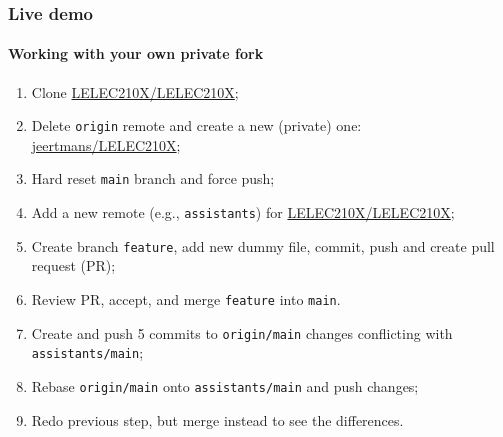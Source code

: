 \documentclass[t, aspectratio=169, english, table]{_style/tudelft-beamer}
\begin{document}
\begin{frame}
  \frametitle{Live demo}
  \framesubtitle{Working with your own private fork}

  \begin{enumerate}
    \item Clone \href{https://github.com/LELEC210X/LELEC210X}{\color{tud primary}LELEC210X/LELEC210X};
    \item Delete \texttt{origin} remote and create a new (private) one:  \href{https://github.com/jeertmans/LELEC210X}{\color{tud primary}jeertmans/LELEC210X};
    \item Hard reset \texttt{main} branch and force push;
    \item Add a new remote (e.g., \texttt{assistants}) for \href{https://github.com/LELEC210X/LELEC210X}{\color{tud primary}LELEC210X/LELEC210X};
    \item Create branch \texttt{feature}, add new dummy file, commit, push and create pull request (PR);
    \item Review PR, accept, and merge \texttt{feature} into \texttt{main}.
    \item Create and push 5 commits to \texttt{origin/main} changes conflicting with \texttt{assistants/main};
    \item Rebase \texttt{origin/main} onto \texttt{assistants/main} and push changes;
    \item Redo previous step, but merge instead to see the differences.
  \end{enumerate}
\end{frame}
\end{document}
